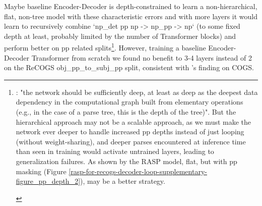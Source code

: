 \documentclass[11pt]{article}
\begin{document}
Maybe \cite{Wu2023} baseline Encoder-Decoder is depth-constrained to learn a non-hierarchical, flat, non-tree model with these characteristic errors and with more layers it would learn to recursively combine `np\_det pp np -> np\_pp -> np` (to some fixed depth at least, probably limited by the number of Transformer blocks) and perform better on pp related splits\footnote{\begin{footnotesize}\cite{Csordas2022}: "the network should be sufficiently deep, at least as deep as the deepest data dependency in the computational graph built from elementary operations (e.g., in the case of a parse tree, this is the depth of the tree)". But the hierarchical approach may not be a scalable approach, as we must make the network ever deeper to handle increased pp depths instead of just looping (without weight-sharing), and deeper parses encountered at inference time than seen in training would activate untrained layers, leading to generalization failures. As shown by the RASP model, flat, but with pp masking (Figure \ref{rasp-for-recogs-decoder-loop-supplementary-figure_pp_depth_2}), may be a better strategy.\end{footnotesize}}. However, training a \cite{Wu2023} baseline Encoder-Decoder Transformer from scratch we found no benefit to 3-4 layers instead of 2 on the ReCOGS obj\_pp\_to\_subj\_pp split, consistent with \cite{petty2024impactdepthcompositionalgeneralization}'s finding on COGS.
\end{document}
